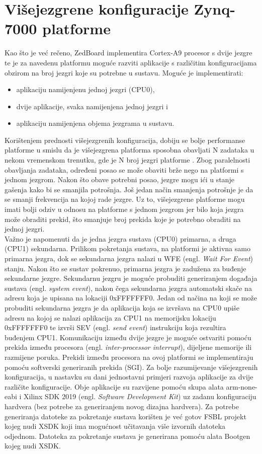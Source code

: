 \documentclass[times, utf8, diplomski, numeric]{fer}
\begin{document}
\chapter{Višejezgrene konfiguracije Zynq-7000 platforme}
Kao što je već rečeno, ZedBoard implementira Cortex-A9 procesor s dvije jezgre te je za navedenu
platformu moguće razviti aplikacije s različitim konfiguracijama obzirom na broj jezgri koje su potrebne
u sustavu. Moguće je implementirati:
\begin{itemize}
  \item{aplikaciju namijenjenu jednoj jezgri (CPU0),}
  \item{dvije aplikacije, svaka namijenjena jednoj jezgri i}
  \item{aplikaciju namijenjena objema jezgrama u sustavu.}
\end{itemize}
Korištenjem prednosti višejezgrenih konfiguracija, dobiju se bolje performanse platforme u smislu da je višejezgrena platforma
sposobna obavljati N zadataka u nekom vremenskom trenutku, gde je N broj jezgri platforme \cite{cortexa_pg}. Zbog paralelnosti
obavljanja zadataka, određeni posao se može obaviti brže nego na platformi s jednom jezgrom. Nakon što obave potrebni posao,
jezgre mogu ići u stanje gašenja kako bi se smanjila potrošnja. Još jedan način smanjenja potrošnje je da se smanji frekvencija
na kojoj rade jezgre. Uz to, višejezgrene platforme mogu imati bolji odziv u odnosu na platforme s jednom jezgrom jer bilo koja
jezgra može obraditi prekid, što smanjuje broj prekida koje je potrebno obraditi na jednoj jezgri.\\
Važno je napomenuti da je jedna jezgra sustava (CPU0) primarna, a druga (CPU1) sekundarna. Prilikom
pokretanja sustava, na platformi je aktivna samo primarna jezgra, dok se sekundarna jezgra nalazi u
WFE (engl. \textit{Wait For Event}) stanju. Nakon što se sustav pokrenuo, primarna jezgra je zadužena
za buđenje sekundarne jezgre. Sekundarnu jezgru je moguće probuditi generiranjem događaja sustava
(engl. \textit{system event}), nakon čega sekundarna jezgra automatski skače na adresu koja je upisana
na lokaciji 0xFFFFFFF0. Jedan od načina na koji se može probuditi sekundarna jezgra je da aplikacija
koja se izvršava na CPU0 upiše adresu na kojoj se nalazi aplikacija za CPU1 na memorijsku lokaciju
0xFFFFFFF0 te izvrši SEV (engl. \textit{send event}) instrukciju koja rezultira buđenjem CPU1.
Komunikaciju između dvije jezgre je moguće ostvariti pomoću prekida između procesora
(engl. \textit{inter-processor interrupt}), dijeljene memorije ili razmijene poruka. Prekidi između procesora
na ovoj platformi se implementiraju pomoću softverski generiranih prekida (SGI). Za bolje razumijevanje
višejezgrenih konfiguracija, u nastavku su dani jednostavni primjeri razvoja aplikacije za dvije različite
konfiguracije. Obje aplikacije su razvijene pomoću skupa alata arm-none-eabi i Xilinx SDK 2019 (engl.
\textit{Software Development Kit}) uz zadanu konfiguraciju hardvera (bez potrebe za generiranjem
novog dizajna hardvera). Za potrebe generiranja datoteke za pokretanje sustava korišten je već gotov FSBL projekt
kojeg nudi XSDK koji ima mogućnost učitavanja više izvornih datoteka odjednom. Datoteka za pokretanje sustava je
generirana pomoću alata Bootgen kojeg nudi XSDK.
\end{document}
